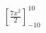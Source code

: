 \documentclass[preview]{standalone}
\begin{document}
\begin{align*}
\left[\frac{7 x^{2}}{2}\right]_{-10}^{10}
\end{align*}
\end{document}
